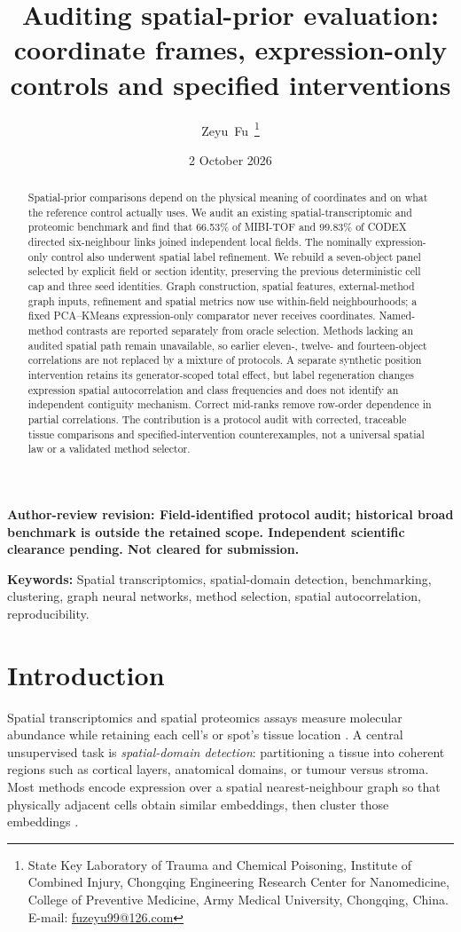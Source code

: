 \documentclass[11pt]{article}
\title{Auditing spatial-prior evaluation:\\
coordinate frames, expression-only controls and specified interventions}
\author{Zeyu~Fu\,\orcidlink{0009-0001-8329-0108}%
\thanks{State Key Laboratory of Trauma and Chemical Poisoning, Institute of
Combined Injury, Chongqing Engineering Research Center for Nanomedicine, College of Preventive
Medicine, Army Medical University, Chongqing, China. E-mail:
\href{mailto:fuzeyu99@126.com}{fuzeyu99@126.com}}}
\date{2 October 2026}
\begin{document}
\raggedbottom

\maketitle
\begin{center}\small\bfseries Author-review revision: Field-identified protocol audit; historical broad benchmark is outside the retained scope. Independent scientific clearance pending. Not cleared for submission.\end{center}

\begin{abstract}
Spatial-prior comparisons depend on the physical meaning of coordinates and on what the reference control actually uses. We audit an existing spatial-transcriptomic and proteomic benchmark and find that 66.53\% of MIBI-TOF and 99.83\% of CODEX directed six-neighbour links joined independent local fields. The nominally expression-only control also underwent spatial label refinement. We rebuild a seven-object panel selected by explicit field or section identity, preserving the previous deterministic cell cap and three seed identities. Graph construction, spatial features, external-method graph inputs, refinement and spatial metrics now use within-field neighbourhoods; a fixed PCA--KMeans expression-only comparator never receives coordinates. Named-method contrasts are reported separately from oracle selection. Methods lacking an audited spatial path remain unavailable, so earlier eleven-, twelve- and fourteen-object correlations are not replaced by a mixture of protocols. A separate synthetic position intervention retains its generator-scoped total effect, but label regeneration changes expression spatial autocorrelation and class frequencies and does not identify an independent contiguity mechanism. Correct mid-ranks remove row-order dependence in partial correlations. The contribution is a protocol audit with corrected, traceable tissue comparisons and specified-intervention counterexamples, not a universal spatial law or a validated method selector.
\end{abstract}

\noindent\textbf{Keywords:}
Spatial transcriptomics, spatial-domain detection, benchmarking, clustering, graph neural networks, method
selection, spatial autocorrelation, reproducibility.

\section{Introduction}
Spatial transcriptomics and spatial proteomics assays measure molecular abundance while retaining each
cell's or spot's tissue location \citep{stahl2016st,moffitt2018merfish}. A central unsupervised task is
\emph{spatial-domain detection}: partitioning a tissue into coherent regions such as cortical layers,
anatomical domains, or tumour versus stroma. Most methods encode expression over a spatial nearest-neighbour graph so
that physically adjacent cells obtain similar embeddings, then cluster those embeddings
\citep{dong2022stagate,xu2024sedr,long2023graphst,ren2022spaceflow,hu2021spagcn}.
\end{document}
